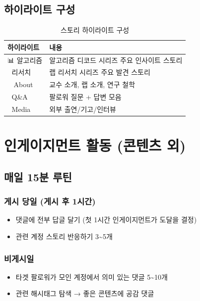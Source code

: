 \documentclass[11pt, a4paper]{article}
\begin{document}
\subsection{하이라이트 구성}

\begin{table}[h!]
\centering
\begin{tabularx}{\textwidth}{l Y}
\toprule
\textbf{하이라이트} & \textbf{내용} \\
\midrule
📊 알고리즘 & 알고리즘 디코드 시리즈 주요 인사이트 스토리 \\
🔬 리서치 & 랩 리서치 시리즈 주요 발견 스토리 \\
🧑‍🏫 About & 교수 소개, 랩 소개, 연구 철학 \\
💬 Q\&A & 팔로워 질문 + 답변 모음 \\
📰 Media & 외부 출연/기고/인터뷰 \\
\bottomrule
\end{tabularx}
\caption{스토리 하이라이트 구성}
\end{table}


\section{인게이지먼트 활동 (콘텐츠 외)}

\subsection{매일 15분 루틴}

\subsubsection{게시 당일 (게시 후 1시간)}
\begin{itemize}[leftmargin=2em]
  \item 댓글에 전부 답글 달기 (첫 1시간 인게이지먼트가 도달을 결정)
  \item 관련 계정 스토리 반응하기 3\textasciitilde 5개
\end{itemize}

\subsubsection{비게시일}
\begin{itemize}[leftmargin=2em]
  \item 타겟 팔로워가 모인 계정에서 의미 있는 댓글 5\textasciitilde 10개
  \item 관련 해시태그 탐색 → 좋은 콘텐츠에 공감 댓글
\end{itemize}
\end{document}
